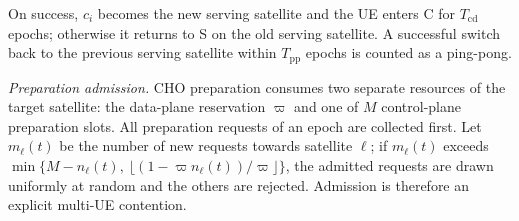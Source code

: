 \documentclass[journal]{IEEEtran}
\begin{document}
On success, $c_i$ becomes the new serving satellite and the UE enters
\textsf{C} for $T_{\mathrm{cd}}$ epochs; otherwise it returns to \textsf{S} on
the old serving satellite. A successful switch back to the previous serving
satellite within $T_{\mathrm{pp}}$ epochs is counted as a ping-pong.

\emph{Preparation admission.} CHO preparation consumes two separate resources
of the target satellite: the data-plane reservation $\varpi$ and one of $M$
control-plane preparation slots. All preparation requests of an epoch are
collected first. Let $m_\ell(t)$ be the number of new requests towards
satellite $\ell$; if $m_\ell(t)$ exceeds
$\min\{M-n_\ell(t),\ \lfloor(1-\varpi n_\ell(t))/\varpi\rfloor\}$, the
admitted requests are drawn uniformly at random and the others are rejected.
Admission is therefore an explicit multi-UE contention.
\end{document}

